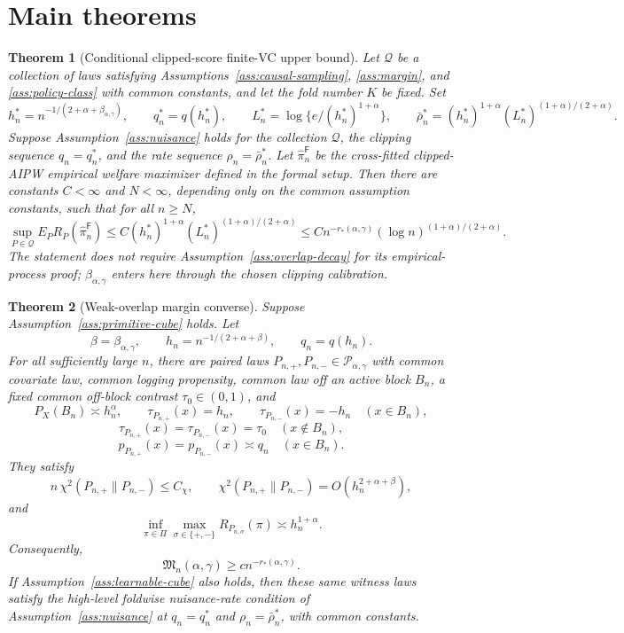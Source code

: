 \documentclass[11pt]{article}
\theoremstyle{definition}
\theoremstyle{plain}
\newtheorem{theorem}{Theorem}
\theoremstyle{remark}
\begin{document}
\section{Main theorems}
\begin{theorem}[Conditional clipped-score finite-VC upper bound]\label{thm:feasible-upper-log}\label{conj:upper-rate}
Let \(\mathcal Q\) be a collection of laws satisfying
Assumptions~\ref{ass:causal-sampling}, \ref{ass:margin}, and
\ref{ass:policy-class} with common constants, and let the fold number \(K\)
be fixed.  Set
\[
h_n^*=n^{-1/(2+\alpha+\beta_{\alpha,\gamma})},
\qquad q_n^*=q(h_n^*),
\qquad
L_n^*=\log\{e/(h_n^*)^{1+\alpha}\},
\qquad
\bar\rho_n^*=(h_n^*)^{1+\alpha}(L_n^*)^{(1+\alpha)/(2+\alpha)}.
\]
Suppose Assumption~\ref{ass:nuisance} holds for the collection
\(\mathcal Q\), the clipping sequence \(q_n=q_n^*\), and the rate sequence
\(\rho_n=\bar\rho_n^*\).  Let \(\widehat\pi_n^{\mathsf F}\) be the
cross-fitted clipped-AIPW empirical welfare maximizer defined in the formal
setup.  Then there are constants \(C<\infty\) and \(N<\infty\), depending
only on the common assumption constants, such that for all \(n\ge N\),
\[
\sup_{P\in\mathcal Q}
E_P R_P(\widehat\pi_n^{\mathsf F})
\le
C (h_n^*)^{1+\alpha}(L_n^*)^{(1+\alpha)/(2+\alpha)}
\le
C n^{-r_*(\alpha,\gamma)}(\log n)^{(1+\alpha)/(2+\alpha)}.
\]
The statement does not require Assumption~\ref{ass:overlap-decay} for its
empirical-process proof; \(\beta_{\alpha,\gamma}\) enters here through the
chosen clipping calibration.
\end{theorem}

\begin{theorem}[Weak-overlap margin converse]\label{thm:lower-full-class}\label{conj:lower-calibration}
Suppose Assumption~\ref{ass:primitive-cube} holds.  Let
\[
\beta=\beta_{\alpha,\gamma},\qquad
h_n=n^{-1/(2+\alpha+\beta)},\qquad
q_n=q(h_n).
\]
For all sufficiently large \(n\), there are paired laws
\(P_{n,+},P_{n,-}\in\mathcal P_{\alpha,\gamma}\) with common covariate law,
common logging propensity, common law off an active block \(B_n\), a fixed
common off-block contrast \(\tau_0\in(0,1)\), and
\[
P_X(B_n)\asymp h_n^\alpha,\qquad
\tau_{P_{n,+}}(x)=h_n,\qquad
\tau_{P_{n,-}}(x)=-h_n
\quad (x\in B_n),
\]
\[
\tau_{P_{n,+}}(x)=\tau_{P_{n,-}}(x)=\tau_0
\quad (x\notin B_n),
\]
\[
p_{P_{n,+}}(x)=p_{P_{n,-}}(x)\asymp q_n
\quad (x\in B_n).
\]
They satisfy
\[
n\,\chi^2(P_{n,+}\|P_{n,-})\le C_\chi,
\qquad
\chi^2(P_{n,+}\|P_{n,-})=O(h_n^{2+\alpha+\beta}),
\]
and
\[
\inf_{\pi\in\Pi}
\max_{\sigma\in\{+,-\}}R_{P_{n,\sigma}}(\pi)
\asymp h_n^{1+\alpha}.
\]
Consequently,
\[
\mathfrak M_n(\alpha,\gamma)\ge c n^{-r_*(\alpha,\gamma)}.
\]
If Assumption~\ref{ass:learnable-cube} also holds, then these same witness
laws satisfy the high-level foldwise nuisance-rate condition of
Assumption~\ref{ass:nuisance} at \(q_n=q_n^*\) and
\(\rho_n=\bar\rho_n^*\), with common constants.
\end{theorem}
\end{document}
